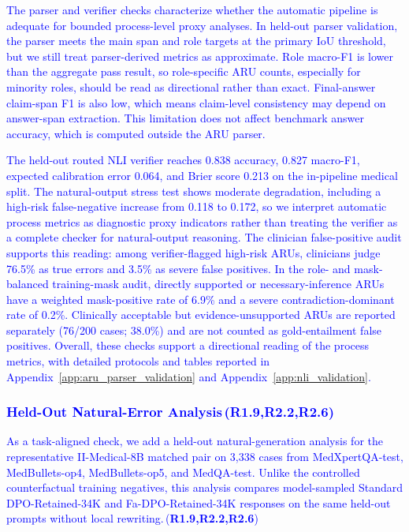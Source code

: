 \documentclass[a4paper,fleqn,doubleblind]{cas-sc}
\DeclareRobustCommand{\added}[1]{\textcolor{blue}{#1}}
\DeclareRobustCommand{\revtag}[1]{\textcolor{blue}{\scriptsize\,(\textbf{#1})}}
\begin{document}
\added{The parser and verifier checks characterize whether the automatic pipeline is adequate for bounded process-level proxy analyses. In held-out parser validation, the parser meets the main span and role targets at the primary IoU threshold, but we still treat parser-derived metrics as approximate. Role macro-F1 is lower than the aggregate pass result, so role-specific ARU counts, especially for minority roles, should be read as directional rather than exact. Final-answer claim-span F1 is also low, which means claim-level consistency may depend on answer-span extraction. This limitation does not affect benchmark answer accuracy, which is computed outside the ARU parser.}

\added{The held-out routed NLI verifier reaches 0.838 accuracy, 0.827 macro-F1, expected calibration error 0.064, and Brier score 0.213 on the in-pipeline medical split. The natural-output stress test shows moderate degradation, including a high-risk false-negative increase from 0.118 to 0.172, so we interpret automatic process metrics as diagnostic proxy indicators rather than treating the verifier as a complete checker for natural-output reasoning. The clinician false-positive audit supports this reading: among verifier-flagged high-risk ARUs, clinicians judge 76.5\% as true errors and 3.5\% as severe false positives. In the role- and mask-balanced training-mask audit, directly supported or necessary-inference ARUs have a weighted mask-positive rate of 6.9\% and a severe contradiction-dominant rate of 0.2\%. Clinically acceptable but evidence-unsupported ARUs are reported separately (76/200 cases; 38.0\%) and are not counted as gold-entailment false positives. Overall, these checks support a directional reading of the process metrics, with detailed protocols and tables reported in Appendix~\ref{app:aru_parser_validation} and Appendix~\ref{app:nli_validation}.}

\subsubsection{\added{Held-Out Natural-Error Analysis}\revtag{R1.9,R2.2,R2.6}}
\label{subsec:heldout_natural_error_analysis}

\added{As a task-aligned check, we add a held-out natural-generation analysis for the representative II-Medical-8B matched pair on 3,338 cases from MedXpertQA-test, MedBullets-op4, MedBullets-op5, and MedQA-test. Unlike the controlled counterfactual training negatives, this analysis compares model-sampled Standard DPO-Retained-34K and Fa-DPO-Retained-34K responses on the same held-out prompts without local rewriting.}\revtag{R1.9,R2.2,R2.6}
\end{document}
